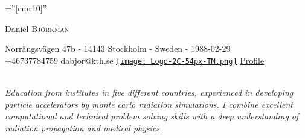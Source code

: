 \documentclass[a4paper,10pt]{article}
\begin{document}
\pagestyle{empty} %
 
\font\fb=''[cmr10]'' %
\par{\centering
        {\Huge Daniel \textsc{Björkman}
        
    }Norrängsvägen 47b - 14143 Stockholm - Sweden - 1988-02-29\\
    \phone \enspace +46737784759 \textbullet \enspace \Envelope \enspace dabjor@kth.se \textbullet   \href{http://www.linkedin.com/in/danielbjorkman88}{\texttt{[image: Logo-2C-54px-TM.png]}} \href{http://www.linkedin.com/in/danielbjorkman88}{Profile} \\ \\
   
    \centering
 
    \bigskip\par
    }
  
 
\emph{Education from institutes in five different countries, experienced in developing particle accelerators by monte carlo radiation simulations. I combine excellent computational and technical problem solving skills with a deep understanding of radiation propagation and medical physics.}
 

 
\end{document}
